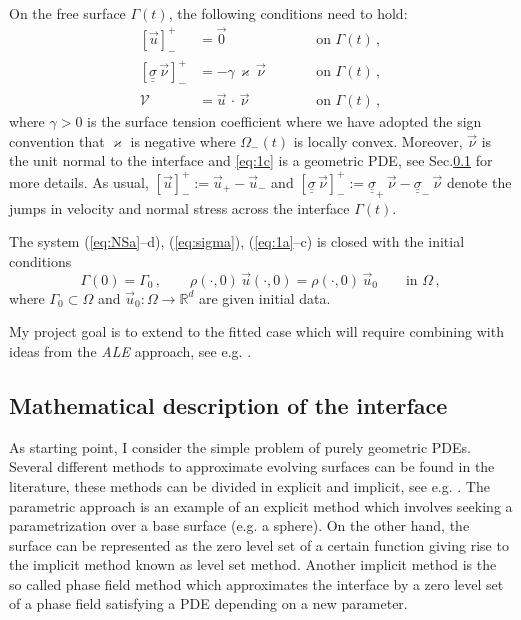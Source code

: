 \documentclass[a4paper,11pt, onecolumn]{article}
\newcommand{\cor}[1]{\textit{#1}} %
\begin{document}
\noindent On the free surface $\Gamma(t)$, the following conditions need to hold:
\begin{subequations}
 \begin{alignat}{2}
  [\vec u]_-^+ & = \vec 0 \qquad &&\mbox{on } \Gamma(t)\,, \label{eq:1a} \\ 
  [\underline{\underline{\sigma}}\,\vec \nu]_-^+ & = -\gamma\,\varkappa\,\vec\nu \qquad &&\mbox{on } \Gamma(t)\,, \label{eq:1b} \\ 
  \mathcal{V} &= \vec u\,\cdot\,\vec \nu \qquad &&\mbox{on } \Gamma(t)\,, 
  \label{eq:1c} 
 \end{alignat}
\end{subequations}
where $\gamma>0$ is the surface tension coefficient where we have adopted the sign convention that $\varkappa$ is negative where $\Omega_-(t)$ is locally convex. Moreover, $\vec{\nu}$ is the unit normal to the interface and \eqref{eq:1c} is a geometric PDE, see Sec.\ref{subsec:math_form_interface} for more details. As usual, $[\vec u]_-^+ := \vec u_+ - \vec u_-$ and $[\underline{\underline{\sigma}}\,\vec\nu]_-^+ := \underline{\underline{\sigma}}_+\,\vec\nu - \underline{\underline{\sigma}}_-\,\vec\nu$ denote the jumps in velocity and normal stress across the interface $\Gamma(t)$. 
\newline

\noindent The system (\ref{eq:NSa}--d), (\ref{eq:sigma}), (\ref{eq:1a}--c) is closed with the initial conditions
\begin{equation} \label{eq:1d}
 \Gamma(0) = \Gamma_0 \,, \qquad \rho(\cdot,0)\,\vec u(\cdot,0) = \rho(\cdot,0)\,\vec u_0 \qquad \mbox{in } \Omega\,,
\end{equation}
where $\Gamma_0 \subset \Omega$ and $\vec u_0 : \Omega \to \mathbb{R}^d$ are given initial data.
\newline

\noindent My project goal is to extend \cite{spurious,fluidfbp} to the fitted case which will require combining \cite{spurious,fluidfbp} with ideas from the \cor{ALE} approach, see e.g. \cite{HughesLZ81,Ganesan06,GerbeauLL06}.

\subsection{Mathematical description of the interface}\label{subsec:math_form_interface}

\noindent As starting point, I consider the simple problem of purely geometric PDEs. Several different methods to approximate evolving surfaces can be found in the literature, these methods can be divided in explicit and implicit, see e.g. \cite{DeckelnickDE05}. The parametric approach is an example of an explicit method which involves seeking a parametrization over a base surface (e.g. a sphere). On the other hand, the surface can be represented as the zero level set of a certain function giving rise to the implicit method known as level set method. Another implicit method is the so called phase field method which approximates the interface by a zero level set of a phase field satisfying a PDE depending on a new parameter.
\newline
\end{document}
